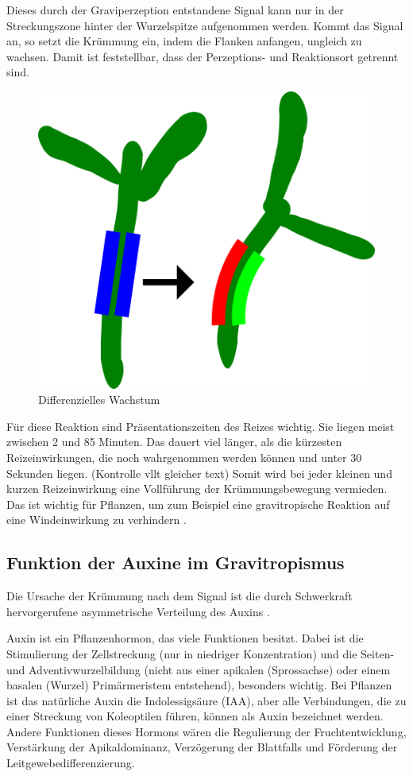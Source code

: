 \documentclass[
a4paper, 
11pt, 
ngerman,
listof=totoc,
bibliography=totocnumbered,
abstracton
]{scrreprt}
\begin{document}
Dieses durch der Graviperzeption entstandene Signal kann nur in der Streckungszone hinter der Wurzelspitze aufgenommen werden. Kommt das Signal an, so setzt die Krümmung ein, indem die Flanken anfangen, ungleich zu wachsen. Damit ist feststellbar, dass der Perzeptions- und Reaktionsort getrennt sind.

\begin{figure}[H]
	\centering 
	\includegraphics[width = 0.3\linewidth]{bilder/diff.png}
	\caption{Differenzielles Wachstum}
\end{figure} 


Für diese Reaktion sind Präsentationszeiten des Reizes wichtig. Sie liegen meist zwischen 2 und 85 Minuten. Das dauert viel länger, als die kürzesten Reizeinwirkungen, die noch wahrgenommen werden können und unter 30 Sekunden liegen. (Kontrolle vllt gleicher text)
Somit wird bei jeder kleinen und kurzen Reizeinwirkung eine Vollführung der Krümmungsbewegung vermieden. Das ist wichtig für Pflanzen, um zum Beispiel eine gravitropische Reaktion auf eine Windeinwirkung zu verhindern \parencite[531]{Luettge}.


\subsection{Funktion der Auxine im Gravitropismus}

Die Ursache der Krümmung nach dem Signal ist die durch Schwerkraft hervorgerufene asymmetrische Verteilung des Auxins  \parencite[502f]{Nultsch}.

Auxin ist ein Pflanzenhormon, das viele Funktionen besitzt. Dabei ist die Stimulierung der Zellstreckung (nur in niedriger Konzentration) und die Seiten- und Adventivwurzelbildung (nicht aus einer apikalen (Sprossachse) oder einem basalen (Wurzel) Primärmeristem entstehend), besonders wichtig. 
Bei Pflanzen ist das natürliche Auxin die Indolessigsäure (IAA), aber alle Verbindungen, die zu einer Streckung von Koleoptilen führen, können als Auxin bezeichnet werden.
Andere Funktionen dieses Hormons wären die Regulierung der Fruchtentwicklung, Verstärkung der Apikaldominanz, Verzögerung der Blattfalls und Förderung der Leitgewebedifferenzierung.
\end{document}
